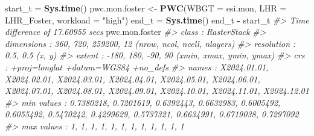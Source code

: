 \documentclass[
]{article}
\newenvironment{Shaded}{\begin{snugshade}}{\end{snugshade}}
\newcommand{\AttributeTok}[1]{\textcolor[rgb]{0.13,0.29,0.53}{#1}}
\newcommand{\CommentTok}[1]{\textcolor[rgb]{0.56,0.35,0.01}{\textit{#1}}}
\newcommand{\FunctionTok}[1]{\textcolor[rgb]{0.13,0.29,0.53}{\textbf{#1}}}
\newcommand{\NormalTok}[1]{#1}
\newcommand{\OtherTok}[1]{\textcolor[rgb]{0.56,0.35,0.01}{#1}}
\newcommand{\SpecialCharTok}[1]{\textcolor[rgb]{0.81,0.36,0.00}{\textbf{#1}}}
\newcommand{\StringTok}[1]{\textcolor[rgb]{0.31,0.60,0.02}{#1}}
\begin{document}
\begin{Shaded}
\begin{Highlighting}[]
\NormalTok{start\_t }\OtherTok{=} \FunctionTok{Sys.time}\NormalTok{()}
\NormalTok{pwc.mon.foster }\OtherTok{\textless{}{-}} \FunctionTok{PWC}\NormalTok{(}\AttributeTok{WBGT =}\NormalTok{ esi.mon,  }\AttributeTok{LHR =}\NormalTok{ LHR\_Foster, }\AttributeTok{workload =} \StringTok{"high"}\NormalTok{)}
\NormalTok{end\_t }\OtherTok{=} \FunctionTok{Sys.time}\NormalTok{()}
\NormalTok{end\_t }\SpecialCharTok{{-}}\NormalTok{ start\_t}
\CommentTok{\#\textgreater{} Time difference of 17.60955 secs}
\NormalTok{pwc.mon.foster}
\CommentTok{\#\textgreater{} class      : RasterStack }
\CommentTok{\#\textgreater{} dimensions : 360, 720, 259200, 12  (nrow, ncol, ncell, nlayers)}
\CommentTok{\#\textgreater{} resolution : 0.5, 0.5  (x, y)}
\CommentTok{\#\textgreater{} extent     : {-}180, 180, {-}90, 90  (xmin, xmax, ymin, ymax)}
\CommentTok{\#\textgreater{} crs        : +proj=longlat +datum=WGS84 +no\_defs }
\CommentTok{\#\textgreater{} names      : X2024.01.01, X2024.02.01, X2024.03.01, X2024.04.01, X2024.05.01, X2024.06.01, X2024.07.01, X2024.08.01, X2024.09.01, X2024.10.01, X2024.11.01, X2024.12.01 }
\CommentTok{\#\textgreater{} min values :   0.7380218,   0.7201619,   0.6392443,   0.6632983,   0.6005492,   0.6055492,   0.5470242,   0.4299629,   0.5737321,   0.6634991,   0.6719038,   0.7297092 }
\CommentTok{\#\textgreater{} max values :           1,           1,           1,           1,           1,           1,           1,           1,           1,           1,           1,           1}
\end{Highlighting}
\end{Shaded}
\end{document}
